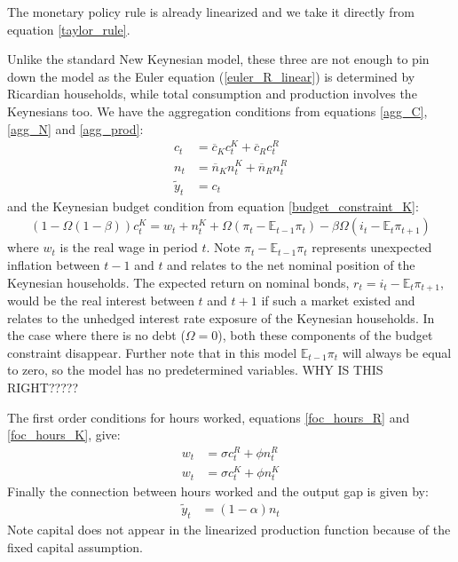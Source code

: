 \documentclass[titlepage]{\econtex}\newcommand{\texname}{ConsumptionHeterogeneity}
\begin{document}
The monetary policy rule is already linearized and we take it directly from equation \ref{taylor_rule}.

Unlike the standard New Keynesian model, these three are not enough to pin down the model as the Euler equation (\ref{euler_R_linear}) is determined by Ricardian households, while total consumption and production involves the Keynesians too. We have the aggregation conditions from equations \ref{agg_C}, \ref{agg_N} and \ref{agg_prod}:
\begin{align}
c_t &= \overline{c}_{K} c^K_t + \overline{c}_{R} c^R_t \label{agg_C_linear} \\
n_t &= \overline{n}_{K} n^K_t + \overline{n}_{R} n^R_t \label{agg_N_linear} \\
\tilde{y}_t &= c_t \label{agg_prod_linear}
\end{align}
and the Keynesian budget condition from equation \ref{budget_constraint_K}:
\begin{align}
(1-\Omega (1-\beta)) c^K_t = w_t + n^K_t + \Omega \left(\pi_t - \mathbb{E}_{t-1}\pi_t\right) - \beta \Omega  (i_t - \mathbb{E}_t \pi_{t+1})  \label{budget_constraint_K_linear}
\end{align}
where $w_t$ is the real wage in period $t$. Note $\pi_t - \mathbb{E}_{t-1}\pi_t$ represents unexpected inflation between $t-1$ and $t$ and relates to the net nominal position of the Keynesian households. The expected return on nominal bonds, $r_t = i_t - \mathbb{E}_t \pi_{t+1}$, would be the real interest between $t$ and $t+1$ if such a market existed and relates to the unhedged interest rate exposure of the Keynesian households. In the case where there is no debt ($\Omega=0$), both these components of the budget constraint disappear. Further note that in this model $\mathbb{E}_{t-1}\pi_t$ will always be equal to zero, so the model has no predetermined variables. WHY IS THIS RIGHT?????

The first order conditions for hours worked, equations \ref{foc_hours_R} and \ref{foc_hours_K}, give:
\begin{align}
w_t &= \sigma c^R_t + \phi n^R_t \label{foc_hours_R_linear} \\
w_t &= \sigma c^K_t + \phi n^K_t \label{foc_hours_K_linear}
\end{align}
Finally the connection between hours worked and the output gap is given by:
\begin{align}
\tilde{y}_t &= (1-\alpha)n_t  \label{production_linear}
\end{align}
Note capital does not appear in the linearized production function because of the fixed capital assumption.
\end{document}
